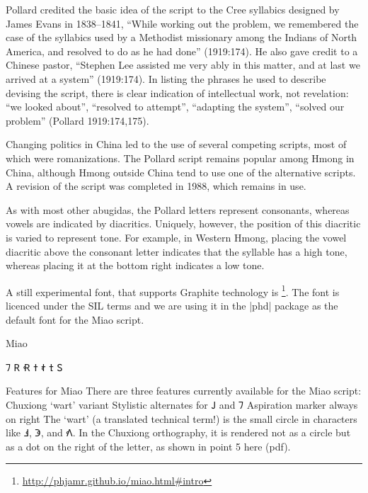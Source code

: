Pollard credited the basic idea of the script to the Cree syllabics designed by James Evans in 1838–1841, “While working out the problem, we remembered the case of the syllabics used by a Methodist missionary among the Indians of North America, and resolved to do as he had done” (1919:174). He also gave credit to a Chinese pastor, “Stephen Lee assisted me very ably in this matter, and at last we arrived at a system” (1919:174). In listing the phrases he used to describe devising the script, there is clear indication of intellectual work, not revelation: “we looked about”, “resolved to attempt”, “adapting the system”, “solved our problem” (Pollard 1919:174,175).

Changing politics in China led to the use of several competing scripts, most of which were romanizations. The Pollard script remains popular among Hmong in China, although Hmong outside China tend to use one of the alternative scripts. A revision of the script was completed in 1988, which remains in use.

As with most other abugidas, the Pollard letters represent consonants, whereas vowels are indicated by diacritics. Uniquely, however, the position of this diacritic is varied to represent tone. For example, in Western Hmong, placing the vowel diacritic above the consonant letter indicates that the syllable has a high tone, whereas placing it at the bottom right indicates a low tone.

A still experimental font, that supports Graphite technology is \footnote{\url{http://phjamr.github.io/miao.html#intro}}. The font is licenced under the SIL terms and we are using it in the |phd| package as the default font for the Miao script.

\newfontfamily{}

\begin{scriptexample}[]{Miao}
\end{scriptexample}

{\miao 𖼴	𖼵	𖼶	𖼷	𖼸	𖼹	𖼺	}

Features for Miao
There are three features currently available for the Miao script:
\bgroup
\miao
Chuxiong ‘wart’ variant
Stylistic alternates for 𖼳 and 𖼴
Aspiration marker always on right
The ‘wart’ (a translated technical term!) is the small circle in characters like 𖼁, 𖼅, and 𖼾. In the Chuxiong orthography, it is rendered not as a circle but as a dot on the right of the letter, as shown in point 5 here (pdf).

